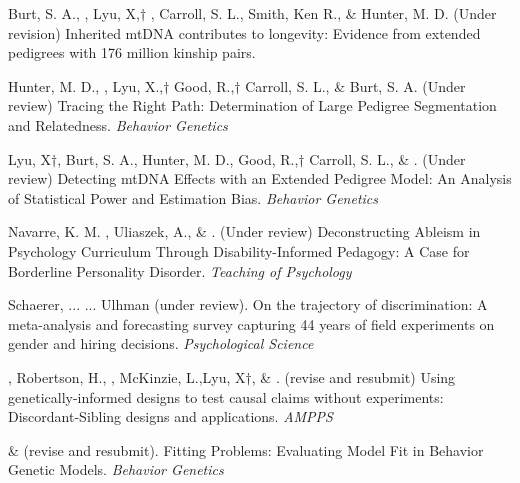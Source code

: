 \item Burt, S. A., \meb, Lyu, X,$\dagger$ \joe, Carroll, S. L., Smith, Ken R., \& Hunter, M. D. (Under revision) Inherited mtDNA contributes to longevity: Evidence from extended pedigrees with 176 million kinship pairs. %

\item Hunter, M. D., \meb, Lyu, X.,$\dagger$ Good, R.,$\dagger$ Carroll, S. L., \& Burt, S. A. (Under review) Tracing the Right Path: Determination of Large Pedigree Segmentation and Relatedness. \textit{Behavior Genetics}

\item Lyu, X$\dagger$, Burt, S. A., Hunter, M. D., Good, R.,$\dagger$ Carroll, S. L., \& \meb. (Under review) Detecting mtDNA Effects with an Extended Pedigree Model: An Analysis of Statistical Power and Estimation Bias. %
\textit{Behavior Genetics}

\item Navarre, K. M. \noteB, Uliaszek, A., \& \meb. (Under review) Deconstructing Ableism in Psychology Curriculum Through Disability-Informed Pedagogy: A Case for Borderline Personality Disorder. \textit{Teaching of Psychology}



\item Schaerer, ... \meb ... Ulhman (under review). On the trajectory of discrimination: A meta-analysis and forecasting survey capturing 44 years of field experiments on gender and hiring decisions. \textit{Psychological Science}


\item \meb, Robertson, H.\noteA, \jt, McKinzie, L.,\noteA Lyu, X$\dagger$, \& \joe. (revise and resubmit) Using genetically-informed designs to test causal claims without experiments: Discordant-Sibling designs and applications. \href{https://osf.io/zpdwt/}{\small\color{blue}{osf.io/zpdwt/}} \textit{AMPPS} %

\item \meb \& \joe (revise and resubmit). Fitting Problems: Evaluating Model Fit in Behavior Genetic Models. \textit{Behavior Genetics}  \href{https://doi.org/10.31234/osf.io/qys83}{\small\color{blue}{10.31234/osf.io/qys83}}


